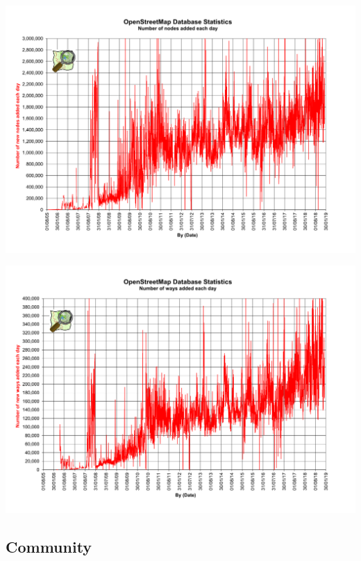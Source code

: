 \documentclass{beamer}
\begin{document}
	\begin{frame}
		\begin{center}
			\includegraphics[width=\textwidth,height=\textheight,keepaspectratio]{images/Osmdbstats7A.png}
		\end{center}
	\end{frame}
	
	\begin{frame}
		\begin{center}
			\includegraphics[width=\textwidth,height=\textheight,keepaspectratio]{images/Osmdbstats7B.png}
		\end{center}
	\end{frame}

	\subsection{Community}
\end{document}

